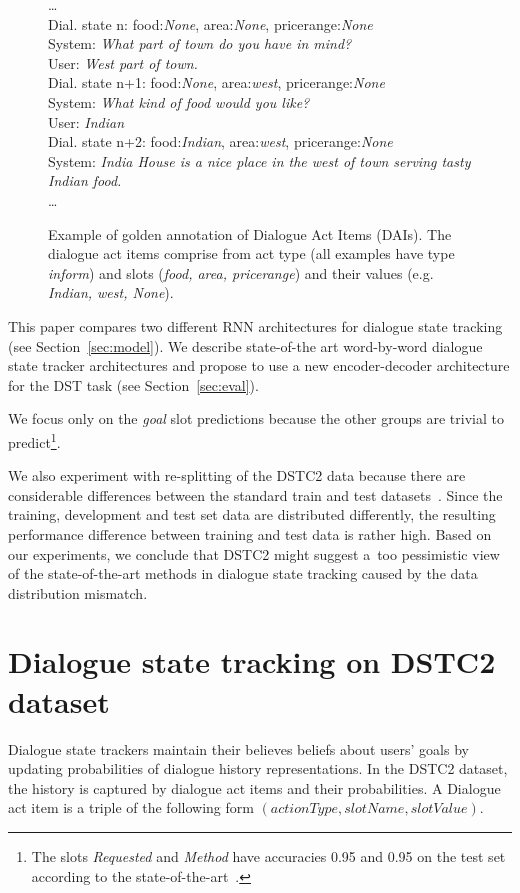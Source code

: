 \documentclass{itatnew}
\def\OD#1{{\color{darkgreen}OD: \it #1}}
\def\area#1{{\color{darkgreen}area:\it #1}}
\def\food#1#2{{Dial. state #1: \color{blue}food:\it #2}}
\def\pricerange#1{{\color{orange}pricerange:\it #1}}
\def\sys#1{{\color{purple}System: \it #1}}
\def\usr#1{{\color{brown}User: \it #1}}
\begin{document}
\begin{figure}
   \dots \\
    \food{n}{None}, \area{None}, \pricerange{None} \\
    \sys{What part of town do you have in mind?} \\
    \usr{West part of town.} \\
    \food{n+1}{None}, \area{west}, \pricerange{None} \\
    \sys{What kind of food would you like?} \\
    \usr{Indian} \\
    \food{n+2}{Indian}, \area{west}, \pricerange{None} \\
    \sys{India House is a nice place in the west of town serving tasty Indian food.} \\
    \dots
    \caption{Example of golden annotation of Dialogue Act Items (DAIs). The dialogue act items comprise from act type (all examples have type {\it inform}) and slots ({\it food, area, pricerange}) and their values (e.g. {\it Indian, west, None}).}
\vspace{-0.70em}
\label{fig:example}
\end{figure}

This paper compares two different RNN architectures for dialogue state tracking (see Section~\ref{sec:model}).
We describe state-of-the art word-by-word dialogue state tracker architectures and propose to use a new encoder-decoder architecture for the DST task (see Section~\ref{sec:eval}).

We focus only on the {\it goal} slot predictions because the other groups are trivial to predict\footnote{The slots {\it Requested} and {\it Method} have accuracies 0.95 and 0.95 on the test set according to the state-of-the-art~\cite{williams2014web}.}. %

We also experiment with re-splitting of the DSTC2 data because there are considerable differences between the standard train and test datasets~\cite{henderson2014second}.
Since the training, development and test set data are distributed differently, the resulting performance difference between training and test data is rather high.
Based on our experiments, we conclude that DSTC2 might suggest a~too pessimistic view of the state-of-the-art methods in dialogue state tracking caused by the data distribution mismatch.


\section{Dialogue state tracking on DSTC2 dataset}\label{sec:dst}
Dialogue state trackers maintain their believes beliefs about users' goals by updating probabilities of dialogue history representations.
In the DSTC2 dataset, the history is captured by dialogue act items and their probabilities.
A Dialogue act item is a triple of the following form $(actionType, slotName, slotValue)$.
\end{document}
